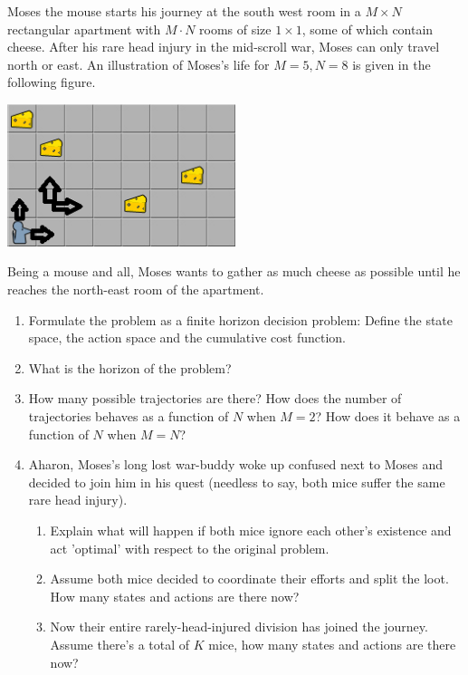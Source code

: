 \begin{exercise}
Moses the mouse starts his journey at the south west room in a $M \times N$ rectangular apartment with $M \cdot N$ rooms of size $1 \times 1$, some of which contain cheese. After his rare head injury in the mid-scroll war, Moses can only travel north or east. An illustration of Moses's life for $M = 5,N = 8$ is given in the following figure.

\begin{center}
\includegraphics[width=0.5\textwidth]{hw1_a}
\end{center}

Being a mouse and all, Moses wants to gather as much cheese as possible until he reaches the north-east room of the apartment.
\begin{enumerate}
  \item Formulate the problem as a finite horizon decision problem: Define the state space, the action space and the cumulative cost function.
  \item What is the horizon of the problem?
  \item How many possible trajectories are there? How does the number of trajectories behaves as a function of $N$ when $M = 2$? How does it behave as a function of $N$  when $M = N$?
  \item Aharon, Moses's long lost war-buddy woke up confused next to Moses and decided to join him in his quest (needless to say, both mice suffer the same rare head injury).
      \begin{enumerate}
        \item Explain what will happen if both mice ignore each other's existence and act 'optimal' with respect to the original problem.
        \item Assume both mice decided to coordinate their efforts and split the loot. How many states and actions are there now?
        \item Now their entire rarely-head-injured division has joined the journey. Assume there's a total of $K$ mice, how many states and actions are there now?
      \end{enumerate}
\end{enumerate}
\end{exercise}

